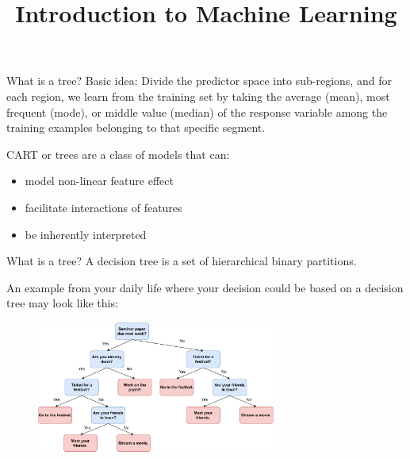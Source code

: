 \documentclass[11pt,compress,t,notes=noshow, xcolor=table]{beamer}
\title{Introduction to Machine Learning}
\institute{\href{https://compstat-lmu.github.io/lecture_i2ml/}{compstat-lmu.github.io/lecture\_i2ml}}
\date{}
\begin{document}
\sloppy

\begin{vbframe}{What is a tree?}
Basic idea: Divide the predictor space into sub-regions, and for each region, we learn from the training set by taking the average (mean), most frequent (mode), or middle value (median) of the response variable among the training examples belonging to that specific segment.

\vspace{0.5cm}

    CART or trees are a class of models that can:
  \begin{itemize}
    \item model non-linear feature effect
    \item facilitate interactions of features
    \item be inherently interpreted
  \end{itemize}
\end{vbframe}

\begin{vbframe}{What is a tree?}
A decision tree is a set of hierarchical binary partitions.

An example from your daily life where your decision could be based on a decision tree may look like this:

  \begin{figure}
    \centering
\includegraphics[width=0.7\textwidth, keepaspectratio]{figure/nutshell-example.pdf}
    \end{figure}

\end{vbframe}
\end{document}
